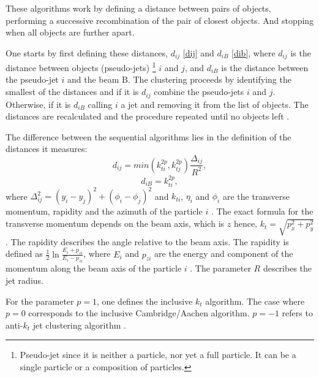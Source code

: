 These algorithms work by defining a distance between pairs of objects, performing a successive recombination of the pair of closest objects. And stopping when all objects are further apart. 

One starts by first defining these distances, $d_{ij}$ \eqref{dij} and $d_{iB}$ \eqref{dib}, where $d_{ij}$ is the distance between objects (pseudo-jets) \footnote{Pseudo-jet since it is neither a particle, nor yet a full particle. It can be a single particle or a composition of particles.} $i$ and $j$, and $d_{iB}$ is the distance between the pseudo-jet $i$ and the beam B. The clustering proceeds by identifying the smallest of the distances and if it is $d_{ij}$ combine the pseudo-jets $i$ and $j$. Otherwise, if it is $d_{iB}$ calling $i$ a jet and removing it from the list of objects. The distances are recalculated and the procedure repeated until no objects left \citep{Cacciari:2008gp}. 



The difference between the sequential algorithms lies in the definition of the distances it measures:
\begin{equation}
d_{ij} = min(k_{ti}^{2p}, k_{tj}^{2p}) \frac{\Delta_{ij}}{R^{2}},
\label{dij}\end{equation}         
\begin{equation}
d_{iB} = k_{ti}^{2p} ,
\label{dib}\end{equation}
where $\Delta_{ij}^{2} = (y_{i} - y_{j})^2 + (\phi_{i} - \phi_{j})^2$ and $k_{ti}$, $\eta_{i}$ and $\phi_{i}$ are the transverse momentum, rapidity and  the azimuth of the particle $i$ \citep{Cacciari:2008gp}. The exact formula for the transverse momentum depends on the beam axis, which is $z$ hence, $k_{t} = \sqrt{p_x^2 + p_y^2}$. The rapidity describes the angle relative to the beam axis.
The rapidity is defined as $\frac{1}{2} \ln \frac{E_i + p_{zi}}{E_i - p_{zi}}$, where  $E_i$ and $p_{zi}$ are the energy and component of the momentum along the beam axis of the particle $i$ \citep{Cacciari:2011ma}. The parameter $R$ describes the jet radius. 

For the parameter $p = 1$, one defines the inclusive $k_t$ algorithm. The case where $p = 0$  corresponds to the inclusive Cambridge/Aachen algorithm. $p = -1$ refers to anti-$k_t$ jet clustering algorithm \citep{Cacciari:2008gp}.

